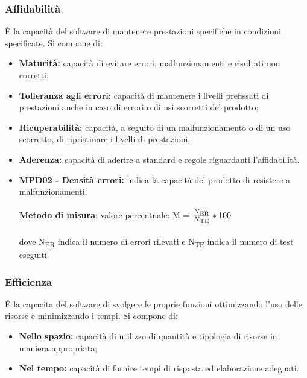 \subsubsection{Affidabilità}
È la capacità del software di mantenere prestazioni specifiche in condizioni specificate.
Si compone di:
\begin{itemize}
    \item \textbf{Maturità: }capacità di evitare errori, malfunzionamenti e risultati non corretti;
    \item \textbf{Tolleranza agli errori: }capacità di mantenere i livelli prefissati di prestazioni anche in caso di errori o di usi scorretti del prodotto;
    \item \textbf{Ricuperabilità: }capacità, a seguito di un malfunzionamento o di un uso scorretto, di ripristinare i livelli di prestazioni;
    \item \textbf{Aderenza: }capacità di aderire a standard e regole riguardanti l'affidabilità.
\end{itemize}
\begin{itemize}
    \item \textbf{MPD02 - Densità errori:} indica la capacità del prodotto di resistere a malfunzionamenti.\\
          \\\textbf{Metodo di misura}: valore percentuale: M = $\frac{N\textsubscript{ER}}{N\textsubscript{TE}}*100$ \\
          \\dove N\textsubscript{ER} indica il numero di errori rilevati e N\textsubscript{TE} indica il numero di test eseguiti.
\end{itemize}
\subsubsection{Efficienza}
\'E la capacita del software di svolgere le proprie funzioni ottimizzando l'uso delle risorse e minimizzando i tempi. Si compone di:
\begin{itemize}
    \item  \textbf{Nello spazio: }capacità di utilizzo di quantità e tipologia di risorse in maniera appropriata;
    \item  \textbf{Nel tempo: }capacità di fornire tempi di risposta ed elaborazione adeguati.
\end{itemize}
